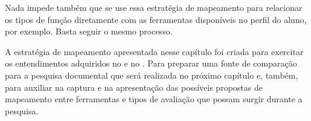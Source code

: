 Nada impede também que se use essa estratégia de mapeamento para relacionar os tipos de função diretamente com as ferramentas disponíveis no perfil do aluno, por exemplo. Basta seguir o mesmo processo.

A estratégia de mapeamento apresentada nesse capítulo foi criada para exercitar os entendimentos adquiridos no  e no . Para preparar uma fonte de comparação para a pesquisa documental que será realizada no próximo capítulo e, também, para auxiliar na captura e na apresentação das possíveis propostas de mapeamento entre ferramentas e tipos de avaliação que possam surgir durante a pesquisa.


